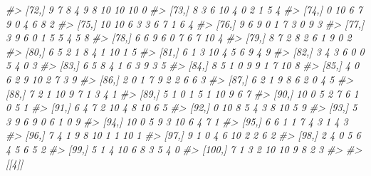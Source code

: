 \documentclass[
]{book}
\newenvironment{Shaded}{\begin{snugshade}}{\end{snugshade}}
\newcommand{\CommentTok}[1]{\textcolor[rgb]{0.56,0.35,0.01}{\textit{#1}}}
\begin{document}
\begin{Shaded}
\begin{Highlighting}[]
\CommentTok{\#\textgreater{}  [72,]    9    7    8    4    9    8   10   10   10     0}
\CommentTok{\#\textgreater{}  [73,]    8    3    6   10    4    0    2    1    5     4}
\CommentTok{\#\textgreater{}  [74,]    0   10    6    7    9    0    4    6    8     2}
\CommentTok{\#\textgreater{}  [75,]   10   10    6    3    3    6    7    1    6     4}
\CommentTok{\#\textgreater{}  [76,]    9    6    9    0    1    7    3    0    9     3}
\CommentTok{\#\textgreater{}  [77,]    3    9    6    0    1    5    5    4    5     8}
\CommentTok{\#\textgreater{}  [78,]    6    6    9    6    0    7    6    7   10     4}
\CommentTok{\#\textgreater{}  [79,]    8    7    2    8    2    6    1    9    0     2}
\CommentTok{\#\textgreater{}  [80,]    6    5    2    1    8    4    1   10    1     5}
\CommentTok{\#\textgreater{}  [81,]    6    1    3   10    4    5    6    9    4     9}
\CommentTok{\#\textgreater{}  [82,]    3    4    3    6    0    0    5    4    0     3}
\CommentTok{\#\textgreater{}  [83,]    6    5    8    4    1    6    3    9    3     5}
\CommentTok{\#\textgreater{}  [84,]    8    5    1    0    9    9    1    7   10     8}
\CommentTok{\#\textgreater{}  [85,]    4    0    6    2    9   10    2    7    3     9}
\CommentTok{\#\textgreater{}  [86,]    2    0    1    7    9    2    2    6    6     3}
\CommentTok{\#\textgreater{}  [87,]    6    2    1    9    8    6    2    0    4     5}
\CommentTok{\#\textgreater{}  [88,]    7    2    1   10    9    7    1    3    4     1}
\CommentTok{\#\textgreater{}  [89,]    5    1    0    1    5    1   10    9    6     7}
\CommentTok{\#\textgreater{}  [90,]   10    0    5    2    7    6    1    0    5     1}
\CommentTok{\#\textgreater{}  [91,]    6    4    7    2   10    4    8   10    6     5}
\CommentTok{\#\textgreater{}  [92,]    0   10    8    5    4    3    8   10    5     9}
\CommentTok{\#\textgreater{}  [93,]    5    3    9    6    9    0    6    1    0     9}
\CommentTok{\#\textgreater{}  [94,]   10    0    5    9    3   10    6    4    7     1}
\CommentTok{\#\textgreater{}  [95,]    6    6    1    1    7    4    3    1    4     3}
\CommentTok{\#\textgreater{}  [96,]    7    4    1    9    8   10    1    1   10     1}
\CommentTok{\#\textgreater{}  [97,]    9    1    0    4    6   10    2    2    6     2}
\CommentTok{\#\textgreater{}  [98,]    2    4    0    5    6    4    5    6    5     2}
\CommentTok{\#\textgreater{}  [99,]    5    1    4   10    6    8    3    5    4     0}
\CommentTok{\#\textgreater{} [100,]    7    1    3    2   10   10    9    8    2     3}
\CommentTok{\#\textgreater{} }
\CommentTok{\#\textgreater{} [[4]]}

\end{Highlighting}
\end{Shaded}
\end{document}
